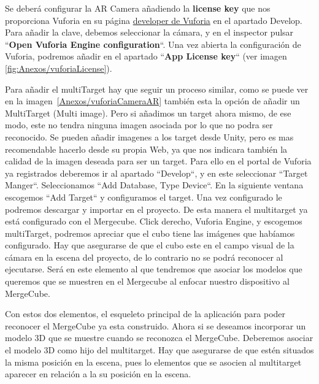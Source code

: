 Se deberá configurar la AR Camera añadiendo la \textbf{license key} que nos proporciona Vuforia en su página \href{https://developer.vuforia.com/license-manager}{developer de Vuforia} en el apartado Develop. Para añadir la clave, debemos seleccionar la cámara, y en el inspector pulsar ``\textbf{Open Vuforia Engine configuration}``. Una vez abierta la configuración de Vuforia, podremos añadir en el apartado ``\textbf{App License key}`` (ver imagen \ref{fig:Anexos/vuforiaLicense}). 



Para añadir el multiTarget hay que seguir un proceso similar, como se puede ver en la imagen~\ref{Anexos/vuforiaCameraAR} también esta la opción de añadir un MultiTarget (Multi image). Pero si añadimos un target ahora mismo, de ese modo, este no tendra ninguna imagen asociada por lo que no podra ser reconocido. Se pueden añadir imagenes a los target desde Unity, pero es mas recomendable hacerlo desde su propia Web, ya que nos indicara también la calidad de la imagen deseada para ser un target. Para ello en el portal de Vuforia ya registrados deberemos ir al apartado ``Develop``, y en este seleccionar ``Target Manger``. Seleccionamos ``Add Database, Type Device``. En la siguiente ventana escogemos ``Add Target`` y configuramos el target. Una vez configurado le podremos descargar y importar en el proyecto. De esta manera el multitarget ya está configurado con el Mergecube. Click derecho, Vuforia Engine, y escogemos multiTarget, podremos apreciar que el cubo tiene las imágenes que habíamos configurado. Hay que asegurarse de que el cubo este en el campo visual de la cámara en la escena del proyecto, de lo contrario no se podrá reconocer al ejecutarse. Será en este elemento al que tendremos que asociar los modelos que queremos que se muestren en el Mergecube al enfocar nuestro dispositivo al MergeCube.


Con estos dos elementos, el esqueleto principal de la aplicación para poder reconocer el MergeCube ya esta construido. Ahora si se deseamos incorporar un modelo 3D que se muestre cuando se reconozca el MergeCube. Deberemos asociar el modelo 3D como hijo del multitarget. Hay que asegurarse de que estén situados la misma posición en la escena, pues lo elementos que se asocien al multitarget aparecer en relación a la su posición en la escena.


